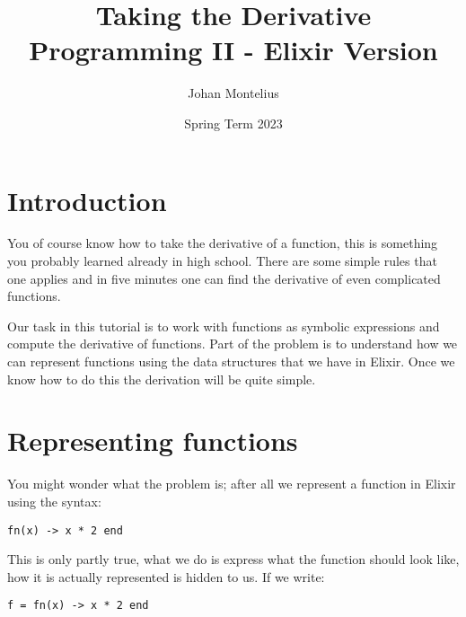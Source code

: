 \documentclass[a4paper,11pt]{article}
\begin{document}

\title{
    \textbf{Taking the Derivative}\\
    \large{Programming II - Elixir Version}
}
\author{Johan Montelius}
\date{Spring Term 2023}
\maketitle
{}



\section*{Introduction}

You of course know how to take the derivative of a function, this is
something you probably learned already in high school. There are some
simple rules that one applies and in five minutes one can find the
derivative of even complicated functions.

Our task in this tutorial is to work with functions as symbolic
expressions and compute the derivative of functions. Part of the
problem is to understand how we can represent functions using the data
structures that we have in Elixir. Once we know how to do this the
derivation will be quite simple.  



\section{Representing functions}

You might wonder what the problem is; after all we represent a function in Elixir using the syntax:

\begin{verbatim}
fn(x) -> x * 2 end
\end{verbatim}

This is only partly true, what we do is express what the function
should look like, how it is actually represented is hidden to us.
If we write:

\begin{verbatim}
f = fn(x) -> x * 2 end
\end{verbatim}
\end{document}
